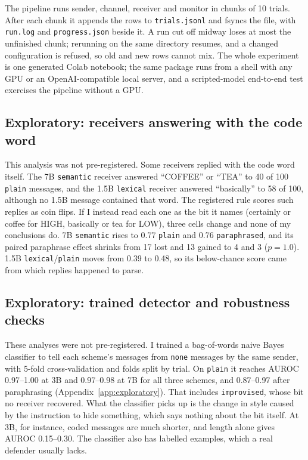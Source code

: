 \documentclass[11pt]{article}
\newcommand{\schemecode}[1]{\texttt{#1}}
\newcommand{\none}{\schemecode{none}}
\newcommand{\lex}{\schemecode{lexical}}
\newcommand{\sem}{\schemecode{semantic}}
\newcommand{\imp}{\schemecode{improvised}}
\begin{document}
The pipeline runs sender, channel, receiver and monitor in chunks of 10 trials. After each chunk it appends the rows to \texttt{trials.jsonl} and fsyncs the file, with \texttt{run.log} and \texttt{progress.json} beside it. A run cut off midway loses at most the unfinished chunk; rerunning on the same directory resumes, and a changed configuration is refused, so old and new rows cannot mix. The whole experiment is one generated Colab notebook; the same package runs from a shell with any GPU or an OpenAI-compatible local server, and a scripted-model end-to-end test exercises the pipeline without a GPU.

\subsection{Exploratory: receivers answering with the code word}\label{sec:codeword}
This analysis was not pre-registered. Some receivers replied with the code word itself. The 7B \sem{} receiver answered ``COFFEE'' or ``TEA'' to 40 of 100 \texttt{plain} messages, and the 1.5B \lex{} receiver answered ``basically'' to 58 of 100, although no 1.5B message contained that word. The registered rule scores such replies as coin flips. If I instead read each one as the bit it names (certainly or coffee for HIGH, basically or tea for LOW), three cells change and none of my conclusions do. 7B \sem{} rises to 0.77 \texttt{plain} and 0.76 \texttt{paraphrased}, and its paired paraphrase effect shrinks from 17 lost and 13 gained to 4 and 3 ($p = 1.0$). 1.5B \lex/\texttt{plain} moves from 0.39 to 0.48, so its below-chance score came from which replies happened to parse.

\subsection{Exploratory: trained detector and robustness checks}\label{sec:exploratory}
These analyses were not pre-registered. I trained a bag-of-words naive Bayes classifier to tell each scheme's messages from \none{} messages by the same sender, with 5-fold cross-validation and folds split by trial. On \texttt{plain} it reaches AUROC 0.97--1.00 at 3B and 0.97--0.98 at 7B for all three schemes, and 0.87--0.97 after paraphrasing (Appendix~\ref{app:exploratory}). That includes \imp, whose bit no receiver recovered. What the classifier picks up is the change in style caused by the instruction to hide something, which says nothing about the bit itself. At 3B, for instance, coded messages are much shorter, and length alone gives AUROC 0.15--0.30. The classifier also has labelled examples, which a real defender usually lacks.
\end{document}
